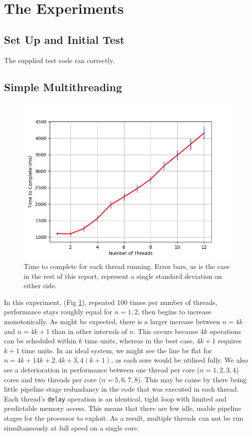 \documentclass[11pt]{article}
\begin{document}
\section{The Experiments}
\subsection{Set Up and Initial Test}
The supplied test code ran correctly.
\subsection{Simple Multithreading}
\begin{figure}
\centering
\includegraphics[scale=0.65]{step2.png}
 \caption{Time to complete for each thread running. Error bars, as is the case in the rest of this report, represent a single standard deviation on either side.}
 \label{fig:step2_1}
\end{figure}

In this experiment, (Fig \ref{fig:step2_1}), repeated 100 times per number of threads, performance stays roughly equal for $n = 1, 2$, then begins to increase monotonically. As might be expected, there is a larger increase between $n= 4k$ and $n= 4k +1$ than in other intervals of $n$. This occurs because $4k$ operations can be scheduled within $k$ time units, whereas in the best case, $4k+1$ requires $k+1$ time units. In an ideal system, we might see the line be flat for $n = 4k+1 4k+2, 4k+3, 4(k+1)$, as each core would be utilised fully. We also see a deterioration in performance between one thread per core ($n = 1, 2, 3, 4$) cores and two threads per core ($n = 5, 6, 7, 8$). This may be cause by there being little pipeline stage redundancy in the code that was executed in each thread. Each thread's \texttt{delay} operation is an identical, tight loop with limited and predictable memory access. This means that there are few idle, usable pipeline stages for the processor to exploit. As a result, multiple threads can not be run simultaneously at full speed on a single core.
\end{document}
